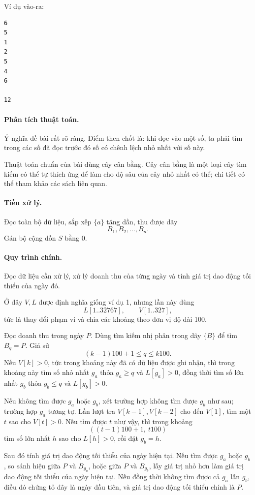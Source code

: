 \documentclass[11pt]{article}
\begin{document}
Ví dụ vào-ra:
\begin{verbatim}
6
5
1
2
5
4
6

12
\end{verbatim}

\paragraph{Phân tích thuật toán.}
Ý nghĩa đề bài rất rõ ràng. Điểm then chốt là: khi đọc vào một số, ta phải tìm
trong các số đã đọc trước đó số có chênh lệch nhỏ nhất với số này.

Thuật toán chuẩn của bài dùng cây cân bằng. Cây cân bằng là một loại cây tìm
kiếm có thể tự thích ứng để làm cho độ sâu của cây nhỏ nhất có thể; chi tiết
có thể tham khảo các sách liên quan.

\paragraph{Tiền xử lý.}
Đọc toàn bộ dữ liệu, sắp xếp \(\{a\}\) tăng dần, thu được dãy
\[
  B_1,B_2,\ldots,B_n.
\]
Gán bộ cộng dồn \(S\) bằng 0.

\paragraph{Quy trình chính.}
Đọc dữ liệu cần xử lý, xử lý doanh thu của từng ngày và tính giá trị dao động
tối thiểu của ngày đó.

Ở đây \(V,L\) được định nghĩa giống ví dụ 1, nhưng lần này dùng
\[
  L[1..32767],\qquad V[1..327],
\]
tức là thay đổi phạm vi và chia các khoảng theo đơn vị độ dài 100.

Đọc doanh thu trong ngày \(P\). Dùng tìm kiếm nhị phân trong dãy \(\{B\}\) để
tìm \(B_q=P\). Giả sử
\[
  (k-1)100+1 \le q \le k100.
\]
Nếu \(V[k]>0\), tức trong khoảng này đã có dữ liệu được ghi nhận, thì trong
khoảng này tìm số nhỏ nhất \(g_a\) thỏa \(g_a\ge q\) và \(L[g_a]>0\), đồng
thời tìm số lớn nhất \(g_b\) thỏa \(g_b\le q\) và \(L[g_b]>0\).

Nếu không tìm được \(g_a\) hoặc \(g_b\), xét trường hợp không tìm được \(g_b\)
như sau; trường hợp \(g_a\) tương tự. Lần lượt tra \(V[k-1],V[k-2]\) cho đến
\(V[1]\), tìm một \(t\) sao cho \(V[t]>0\). Nếu tìm được \(t\) như vậy, thì
trong khoảng
\[
  ((t-1)100+1,\ t100)
\]
tìm số lớn nhất \(h\) sao cho \(L[h]>0\), rồi đặt \(g_b=h\).

Sau đó tính giá trị dao động tối thiểu của ngày hiện tại. Nếu tìm được
\(g_a\) hoặc \(g_b\), so sánh hiệu giữa \(P\) và \(B_{g_a}\), hoặc giữa \(P\)
và \(B_{g_b}\), lấy giá trị nhỏ hơn làm giá trị dao động tối thiểu của ngày
hiện tại. Nếu đồng thời không tìm được cả \(g_a\) lẫn \(g_b\), điều đó chứng
tỏ đây là ngày đầu tiên, và giá trị dao động tối thiểu chính là \(P\).
\end{document}
